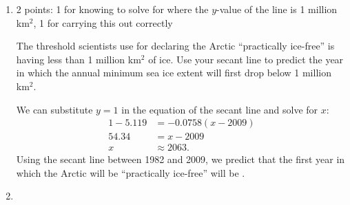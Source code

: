 \documentclass{article}
\makeatletter
\let\@href=\href
\renewcommand{\href}[2]{\@href{#1}{\ul{#2}}}
\makeatother
\begin{document}
\begin{enumerate}
\begin{enumerate}
\begin{problem}[\vfill]
      Use the \href{https://docs.google.com/spreadsheets/d/1Dx8q2itdxCfEfRMkhUi4188zXYFqXQ2MB1_svnefxyg/edit?usp=sharing}{data in the spreadsheet} to find the equation of the secant line between 1982 and 2009.
    \end{problem}

    \begin{solution}
      In 1982, the annual minimum sea ice extent was 7.166 million square kilometers, and in 2009, it was 5.119 million
      square kilometers.

      The average rate of change between 1982 and 2009 is
      \[\frac{5.119-7.166}{2009-1982}\approx -0.0758\text{ million km$^2$ per year}.\]

      This is the slope of the secant line, and we can use point-slope form to write the equation:
      \[\boxed{y - 5.119 = -0.0758(x-2009).}\]
    \end{solution}

  \item \label{sea-ice-when-ice-free-secant-line-prediction}

    \begin{grading}
      2 points: 1 for knowing to solve for where the $y$-value of the line is 1 million km$^2$, 1 for carrying this out correctly 
    \end{grading}

    \begin{problem}[\vfill\newpage]
      The threshold scientists use for declaring the Arctic ``practically ice-free'' is having less than 1 million km$^2$ of ice. Use your secant line to predict the year in which the annual minimum sea ice extent will first drop below 1 million km$^2$.
    \end{problem}

    \begin{solution}
      We can substitute $y=1$ in the equation of the secant line and solve for $x$:
      \begin{align*}
        1 - 5.119 &= -0.0758(x-2009) \\
        54.34 &= x-2009 \\
        x & \approx 2063.
      \end{align*}
      Using the secant line between 1982 and 2009, we predict that the first year in which the Arctic will be
      ``practically ice-free'' will be .
    \end{solution}

  \item \label{sea-ice-compare-prediction}


\end{enumerate}
\end{enumerate}
\end{document}
